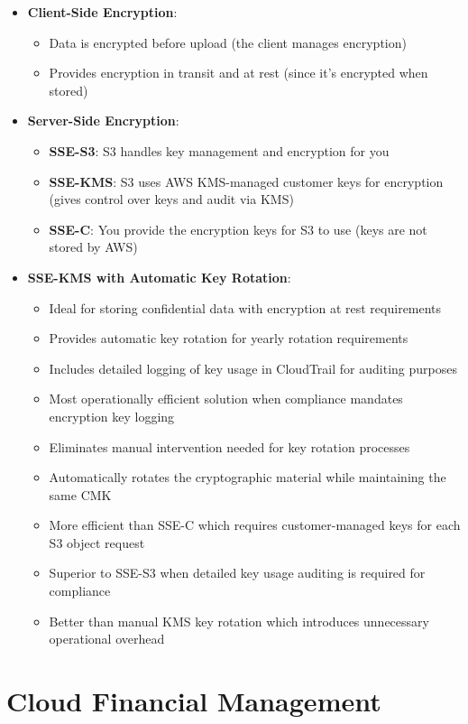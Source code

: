 \documentclass[11pt,a4paper]{report}
\begin{document}
\begin{itemize}
  \item \textbf{Client-Side Encryption}:
\begin{itemize}
  \item Data is encrypted before upload (the client manages encryption)
  \item Provides encryption in transit and at rest (since it's encrypted when stored)
\end{itemize}
  \item \textbf{Server-Side Encryption}:
\begin{itemize}
  \item \textbf{SSE-S3}: S3 handles key management and encryption for you
  \item \textbf{SSE-KMS}: S3 uses AWS KMS-managed customer keys for encryption (gives control over keys and audit via KMS)
  \item \textbf{SSE-C}: You provide the encryption keys for S3 to use (keys are not stored by AWS)
\end{itemize}
  \item \textbf{SSE-KMS with Automatic Key Rotation}:
\begin{itemize}
  \item Ideal for storing confidential data with encryption at rest requirements
  \item Provides automatic key rotation for yearly rotation requirements
  \item Includes detailed logging of key usage in CloudTrail for auditing purposes
  \item Most operationally efficient solution when compliance mandates encryption key logging
  \item Eliminates manual intervention needed for key rotation processes
  \item Automatically rotates the cryptographic material while maintaining the same CMK
  \item More efficient than SSE-C which requires customer-managed keys for each S3 object request
  \item Superior to SSE-S3 when detailed key usage auditing is required for compliance
  \item Better than manual KMS key rotation which introduces unnecessary operational overhead
\end{itemize}
\end{itemize}


\chapter{Cloud Financial Management}
\end{document}
